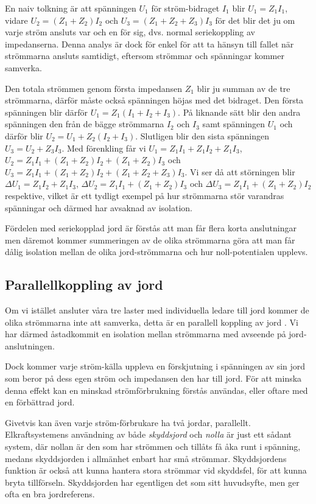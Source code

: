 En naiv tolkning är att spänningen \(U_1\) för ström-bidraget \(I_1\) blir
\(U_1 = Z_1 I_1\), vidare \(U_2 = (Z_1 + Z_2) I_2\) och
\(U_3 = (Z_1 + Z_2 + Z_3) I_3\) för det blir det ju om varje ström ansluts var
och en för sig, dvs. normal seriekoppling av impedanserna. Denna analys är
dock för enkel för att ta hänsyn till fallet när strömmarna ansluts samtidigt,
eftersom strömmar och spänningar kommer samverka.

Den totala strömmen genom första impedansen \(Z_1\) blir ju summan av de tre
strömmarna, därför måste också spänningen höjas med det bidraget. Den första
spänningen blir därför \(U_1=Z_1 (I_1 + I_2 + I_3)\). På liknande sätt blir
den andra spänningen den från de bägge strömmarna \(I_2\) och \(I_3\) samt
spänningen \(U_1\) och därför blir \(U_2 = U_1 + Z_2 (I_2 + I_3)\).
Slutligen blir den sista spänningen \(U_3 = U_2 + Z_3 I_3\). Med förenkling
får vi \(U_1=Z_1 I_1 + Z_1 I_2 + Z_1 I_3\),
\(U_2 = Z_1 I_1 + (Z_1 + Z_2) I_2 + (Z_1 + Z_2) I_3\) och
\(U_3 = Z_1 I_1 + (Z_1 + Z_2) I_2 + (Z_1 + Z_2 + Z_3) I_3\). Vi ser då att
störningen blir \(\Delta U_1 =  Z_1 I_2 + Z_1 I_3\),
\(\Delta U_2 = Z_1 I_1 + (Z_1 + Z_2) I_3\) och
\(\Delta U_3 = Z_1 I_1 + (Z_1 + Z_2) I_2\) respektive, vilket är ett tydligt
exempel på hur strömmarna stör varandras spänningar och därmed har avsaknad
av isolation.

Fördelen med seriekopplad jord är förstås att man får flera korta anslutningar
men däremot kommer summeringen av de olika strömmarna göra att man får dålig
isolation mellan de olika jord-strömmarna och hur noll-potentialen upplevs.

\subsection{Parallellkoppling av jord}

Om vi istället ansluter våra tre laster med individuella ledare till jord
kommer de olika strömmarna inte att samverka, detta är en parallell koppling
av jord \cite[3]{ott1988}. Vi har därmed åstadkommit en isolation mellan
strömmarna med avseende på jord-anslutningen.

Dock kommer varje ström-källa uppleva en förskjutning i spänningen av
sin jord som beror på dess egen ström och impedansen den har till jord. För att
minska denna effekt kan en minskad strömförbrukning förstås användas, eller
oftare med en förbättrad jord.

Givetvis kan även varje ström-förbrukare ha två jordar, parallellt.
Elkraftsystemens användning av både \emph{skyddsjord} och \emph{nolla} är
just ett sådant system, där nollan är den som har strömmen och tillåts få
åka runt i spänning, medans skyddsjorden i allmänhet enbart har små strömmar.
Skyddsjordens funktion är också att kunna hantera stora strömmar vid skyddsfel,
för att kunna bryta tillförseln. Skyddsjorden har egentligen det som
sitt huvudsyfte, men ger ofta en bra jordreferens.

